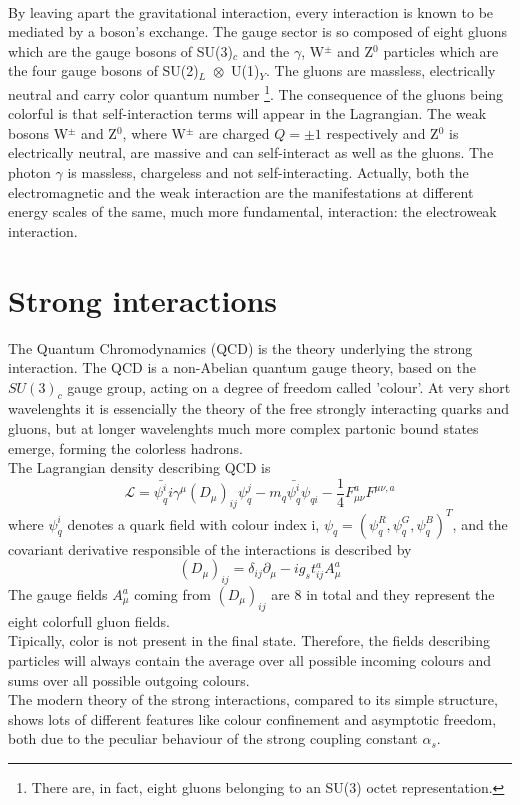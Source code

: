 \\By leaving apart the gravitational interaction, every interaction is known to be mediated by a boson's exchange. The gauge sector is so composed of eight gluons which are the gauge bosons of SU(3)$_{c}$ and the $\gamma$, W$^{\pm}$ and Z$^0$ particles which are the four gauge bosons of \mbox{SU(2)$_{L}$ $\otimes$ U(1)$_{Y}$}. The gluons are massless, electrically neutral and carry color quantum number
\footnote{There are, in fact, eight gluons belonging to an SU(3) octet representation.}. The consequence of the gluons being colorful is that self-interaction terms will appear in the Lagrangian. The weak bosons W$^{\pm}$ and Z$^0$, where W$^{\pm}$ are charged $Q=\pm1$ respectively and Z$^0$ is electrically neutral, are massive and can self-interact as well as the gluons. The photon $\gamma$ is massless, chargeless and not self-interacting\cite{herrero1998standard}.
Actually, both the electromagnetic and the weak interaction are the manifestations at different energy scales of the same, much more fundamental, interaction: the electroweak interaction.

\section{Strong interactions}
The Quantum Chromodynamics (QCD) is the theory underlying the strong interaction. The QCD is a non-Abelian quantum gauge theory, based on the $SU(3)_c$ gauge group, acting on a degree of freedom called 'colour'. At very short wavelenghts it is essencially the theory of the free strongly interacting quarks and gluons, but at longer wavelenghts much more complex partonic bound states emerge, forming the colorless hadrons.
\\
The Lagrangian density describing QCD is 
\begin{equation}
\mathcal{L} = \bar{\psi_q^i}i\gamma^{\mu}(D_{\mu})_{ij}\psi_q^j - m_q\bar{\psi_q^i}\psi_{qi} - \frac{1}{4}F_{\mu\nu}^aF^{\mu\nu,a}
\end{equation}
where $\psi_q^i$ denotes a quark field with colour index i, $\psi_q = (\psi_q^R, \psi_q^G, \psi_q^B)^T$, and the covariant derivative responsible of the interactions is described by
\begin{equation}
(D_{\mu})_{ij} = \delta_{ij}\partial_{\mu} - ig_st_{ij}^aA_{\mu}^a
\end{equation}
The gauge fields $A_{\mu}^a$ coming from $(D_{\mu})_{ij}$ are 8 in total and they represent the eight colorfull gluon fields.
\\
Tipically, color is not present in the final state. Therefore, the fields describing particles will always contain the average over all possible incoming colours and sums over all possible outgoing colours\cite{Skands_2013}.
\\
The modern theory of the strong interactions, compared to its simple structure, shows lots of different features like colour confinement and asymptotic freedom, both due to the peculiar behaviour of the strong coupling constant $\alpha_s$.

